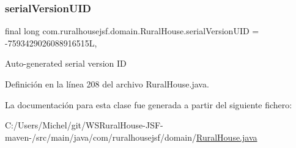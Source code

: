 \subsubsection{\texorpdfstring{serialVersionUID}{serialVersionUID}}
{\footnotesize\ttfamily final long com.\+ruralhousejsf.\+domain.\+Rural\+House.\+serial\+Version\+U\+ID = -\/7593429026088916515L\hspace{0.3cm}{\ttfamily [static]}, {\ttfamily [private]}}

Auto-\/generated serial version ID 

Definición en la línea 208 del archivo Rural\+House.\+java.



La documentación para esta clase fue generada a partir del siguiente fichero\+:\begin{DoxyCompactItemize}
\item 
C\+:/\+Users/\+Michel/git/\+W\+S\+Rural\+House-\/\+J\+S\+F-\/maven-\//src/main/java/com/ruralhousejsf/domain/\mbox{\hyperlink{_rural_house_8java}{Rural\+House.\+java}}\end{DoxyCompactItemize}
